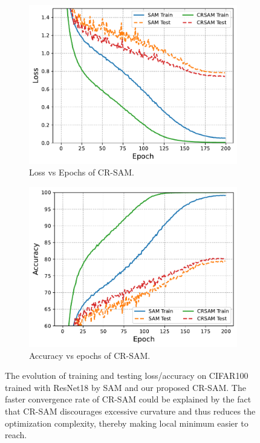 \documentclass[letterpaper]{article} %
\theoremstyle{plain}
\theoremstyle{definition}
\begin{document}
\begin{figure}
   \centering
   \begin{subfigure}[b]{0.48\textwidth}
     \centering
     \includegraphics[width=\textwidth]{figs/loss.pdf}
     \caption{Loss vs Epochs of CR-SAM.}
     \label{fig:loss}
   \end{subfigure}
   \hfill
   \begin{subfigure}[b]{0.48\textwidth}
     \centering
     \includegraphics[width=\textwidth]{figs/accuracy.pdf}
     \caption{Accuracy vs epochs of CR-SAM.}
     \label{fig:acc}
   \end{subfigure}

    \caption{\footnotesize The evolution of training and testing loss/accuracy on CIFAR100 trained with ResNet18 by SAM and our proposed CR-SAM. The faster convergence rate of CR-SAM could be explained by the fact that CR-SAM discourages excessive curvature and thus reduces the optimization complexity, thereby making local minimum easier to reach.}
    \label{fig:convergence}
\end{figure}
\end{document}
